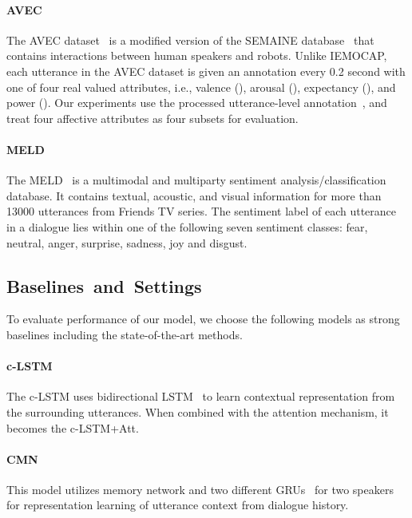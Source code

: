 \documentclass[journal]{IEEEtran}
\begin{document}
\paragraph{AVEC}
The AVEC dataset~\cite{schuller2012avec} is a modified version of the SEMAINE database~\cite{mckeown2011semaine} that contains interactions between human speakers  and robots. Unlike IEMOCAP, each utterance in the AVEC dataset is given an annotation every 0.2 second with one of four real valued attributes, i.e., valence (), arousal (), expectancy (), and power (). Our experiments use the processed utterance-level annotation~\cite{majumder2019dialoguernn}, and treat four affective attributes as four subsets for evaluation.

\paragraph{MELD}
The MELD~\cite{poria2018meld} is a multimodal and multiparty sentiment analysis/classification database. It contains textual, acoustic, and visual information for more than 13000 utterances from Friends TV series. The sentiment label of each utterance in a dialogue lies within one of the following seven sentiment classes: fear, neutral, anger, surprise, sadness, joy and disgust.
\subsection{Baselines~and~Settings}
To evaluate performance of our model, we choose the following models as strong baselines including the state-of-the-art methods.



\paragraph{c-LSTM~\cite{poria2017context}}
The c-LSTM uses bidirectional LSTM~\cite{hochreiter1997long} to learn contextual representation from the surrounding utterances. When combined with the attention mechanism, it becomes the c-LSTM+Att.



\paragraph{CMN~\cite{hazarika2018conversational}}
This model utilizes memory network and two different GRUs~\cite{cho2014learning} for two speakers for representation learning of utterance context from dialogue history.
\end{document}
